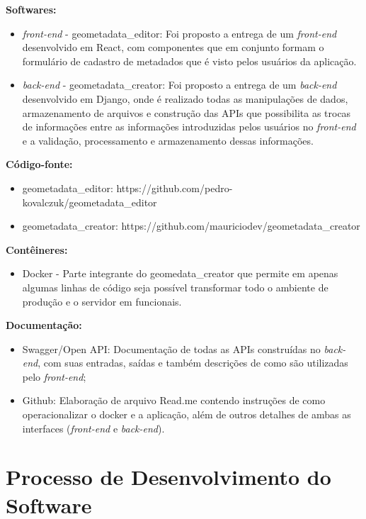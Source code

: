 \textbf{Softwares:} 
\begin{itemize}
\item \textit{front-end} - geometadata\_editor: Foi proposto a entrega de um \textit{front-end} desenvolvido em React, com componentes que em conjunto formam o formulário de cadastro de metadados que é visto pelos usuários da aplicação.
\item \textit{back-end} - geometadata\_creator: Foi proposto a entrega de um \textit{back-end} desenvolvido em Django, onde é realizado todas as manipulações de dados, armazenamento de arquivos e construção das APIs que possibilita as trocas de informações entre as informações introduzidas pelos usuários no \textit{front-end} e a validação, processamento e armazenamento dessas informações.
\end{itemize}

\textbf{Código-fonte:}
\begin{itemize}
\item geometadata\_editor: https://github.com/pedro-kovalczuk/geometadata\_editor
\item geometadata\_creator: https://github.com/mauriciodev/geometadata\_creator
\end{itemize}

\textbf{Contêineres:} 
\begin{itemize}
\item Docker - Parte integrante do geomedata\_creator que permite em apenas algumas linhas de código seja possível transformar todo o ambiente de produção e o servidor em funcionais.
\end{itemize}

\textbf{Documentação:} 
\begin{itemize}
\item Swagger/Open API: Documentação de todas as APIs construídas no \textit{back-end}, com suas entradas, saídas e também descrições de como são utilizadas pelo \textit{front-end};
\item Github: Elaboração de arquivo Read.me contendo instruções de como operacionalizar o docker e a aplicação, além de outros detalhes de ambas as interfaces (\textit{front-end} e \textit{back-end}).
\end{itemize}

\section{Processo de Desenvolvimento do Software}


